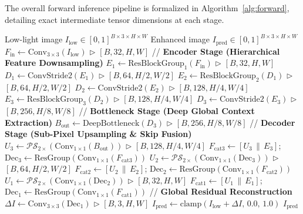 \documentclass[journal,onecolumn,11pt]{IEEEtran}
\begin{document}
The overall forward inference pipeline is formalized in Algorithm~\ref{alg:forward}, detailing exact intermediate tensor dimensions at each stage.

\begin{algorithm}[htbp]
\caption{Encoder--Decoder with PixelShuffle Forward Inference}
\label{alg:forward}
\begin{algorithmic}[1]
\REQUIRE Low-light image $I_{\text{low}} \in [0, 1]^{B \times 3 \times H \times W}$
\ENSURE Enhanced image $I_{\text{pred}} \in [0, 1]^{B \times 3 \times H \times W}$
\STATE $F_{\text{in}} \leftarrow \text{Conv}_{3\times 3}(I_{\text{low}})$ \hfill $\triangleright$ $[B, 32, H, W]$
\STATE // \textbf{Encoder Stage (Hierarchical Feature Downsampling)}
\STATE $E_1 \leftarrow \text{ResBlockGroup}_1(F_{\text{in}})$ \hfill $\triangleright$ $[B, 32, H, W]$
\STATE $D_1 \leftarrow \text{ConvStride2}(E_1)$ \hfill $\triangleright$ $[B, 64, H/2, W/2]$
\STATE $E_2 \leftarrow \text{ResBlockGroup}_2(D_1)$ \hfill $\triangleright$ $[B, 64, H/2, W/2]$
\STATE $D_2 \leftarrow \text{ConvStride2}(E_2)$ \hfill $\triangleright$ $[B, 128, H/4, W/4]$
\STATE $E_3 \leftarrow \text{ResBlockGroup}_3(D_2)$ \hfill $\triangleright$ $[B, 128, H/4, W/4]$
\STATE $D_3 \leftarrow \text{ConvStride2}(E_3)$ \hfill $\triangleright$ $[B, 256, H/8, W/8]$
\STATE // \textbf{Bottleneck Stage (Deep Global Context Extraction)}
\STATE $B_{\text{out}} \leftarrow \text{DeepBottleneck}(D_3)$ \hfill $\triangleright$ $[B, 256, H/8, W/8]$
\STATE // \textbf{Decoder Stage (Sub-Pixel Upsampling \& Skip Fusion)}
\STATE $U_3 \leftarrow \mathcal{PS}_{2\times}(\text{Conv}_{1\times 1}(B_{\text{out}}))$ \hfill $\triangleright$ $[B, 128, H/4, W/4]$
\STATE $F_{\text{cat3}} \leftarrow [U_3 \,\|\, E_3]$; \quad $\text{Dec}_3 \leftarrow \text{ResGroup}(\text{Conv}_{1\times 1}(F_{\text{cat3}}))$
\STATE $U_2 \leftarrow \mathcal{PS}_{2\times}(\text{Conv}_{1\times 1}(\text{Dec}_3))$ \hfill $\triangleright$ $[B, 64, H/2, W/2]$
\STATE $F_{\text{cat2}} \leftarrow [U_2 \,\|\, E_2]$; \quad $\text{Dec}_2 \leftarrow \text{ResGroup}(\text{Conv}_{1\times 1}(F_{\text{cat2}}))$
\STATE $U_1 \leftarrow \mathcal{PS}_{2\times}(\text{Conv}_{1\times 1}(\text{Dec}_2))$ \hfill $\triangleright$ $[B, 32, H, W]$
\STATE $F_{\text{cat1}} \leftarrow [U_1 \,\|\, E_1]$; \quad $\text{Dec}_1 \leftarrow \text{ResGroup}(\text{Conv}_{1\times 1}(F_{\text{cat1}}))$
\STATE // \textbf{Global Residual Reconstruction}
\STATE $\Delta I \leftarrow \text{Conv}_{3\times 3}(\text{Dec}_1)$ \hfill $\triangleright$ $[B, 3, H, W]$
\STATE $I_{\text{pred}} \leftarrow \text{clamp}(I_{\text{low}} + \Delta I,\, 0.0,\, 1.0)$
\RETURN $I_{\text{pred}}$
\end{algorithmic}
\end{algorithm}
\end{document}
